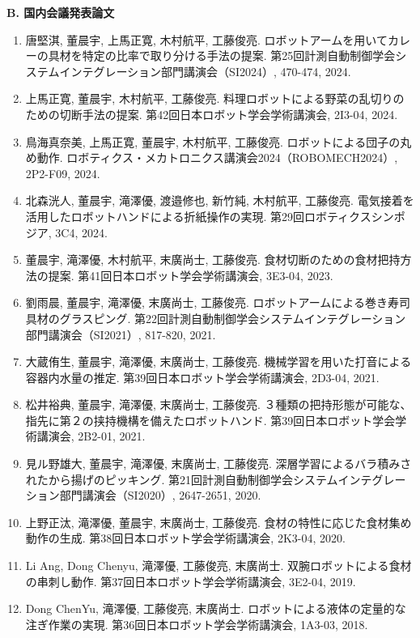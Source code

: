 \vspace{1\baselineskip}
\noindent\textbf{B. 国内会議発表論文}

\begin{enumerate}[
  label=\arabic*).,
  leftmargin=3em,
  itemsep=0.8\baselineskip
]
  \item 唐堅淇, 董晨宇, 上馬正寛, 木村航平, 工藤俊亮. ロボットアームを用いてカレーの具材を特定の比率で取り分ける手法の提案. 第25回計測自動制御学会システムインテグレーション部門講演会（SI2024）, 470-474, 2024.
  \item 上馬正寛, 董晨宇, 木村航平, 工藤俊亮. 料理ロボットによる野菜の乱切りのための切断手法の提案. 第42回日本ロボット学会学術講演会, 2I3-04, 2024.
  \item 鳥海真奈美, 上馬正寛, 董晨宇, 木村航平, 工藤俊亮. ロボットによる団子の丸め動作. ロボティクス・メカトロニクス講演会2024（ROBOMECH2024）, 2P2-F09, 2024.
  \item 北森洸人, 董晨宇, 滝澤優, 渡邉修也, 新竹純, 木村航平, 工藤俊亮. 電気接着を活用したロボットハンドによる折紙操作の実現. 第29回ロボティクスシンポジア, 3C4, 2024.
  \item 董晨宇, 滝澤優, 木村航平, 末廣尚士, 工藤俊亮. 食材切断のための食材把持方法の提案. 第41回日本ロボット学会学術講演会, 3E3-04, 2023.
  \item 劉雨晨, 董晨宇, 滝澤優, 末廣尚士, 工藤俊亮. ロボットアームによる巻き寿司具材のグラスピング. 第22回計測自動制御学会システムインテグレーション部門講演会（SI2021）, 817-820, 2021.
  \item 大蔵侑生, 董晨宇, 滝澤優, 末廣尚士, 工藤俊亮. 機械学習を用いた打音による容器内水量の推定. 第39回日本ロボット学会学術講演会, 2D3-04, 2021.
  \item 松井裕典, 董晨宇, 滝澤優, 末廣尚士, 工藤俊亮. ３種類の把持形態が可能な、指先に第２の挟持機構を備えたロボットハンド. 第39回日本ロボット学会学術講演会, 2B2-01, 2021.
  \item 見ル野雄大, 董晨宇, 滝澤優, 末廣尚士, 工藤俊亮. 深層学習によるバラ積みされたから揚げのピッキング. 第21回計測自動制御学会システムインテグレーション部門講演会（SI2020）, 2647-2651, 2020.
  \item 上野正汰, 滝澤優, 董晨宇, 末廣尚士, 工藤俊亮. 食材の特性に応じた食材集め動作の生成. 第38回日本ロボット学会学術講演会, 2K3-04, 2020.
  \item Li Ang, Dong Chenyu, 滝澤優, 工藤俊亮, 末廣尚士. 双腕ロボットによる食材の串刺し動作. 第37回日本ロボット学会学術講演会, 3E2-04, 2019.
  \item Dong ChenYu, 滝澤優, 工藤俊亮, 末廣尚士. ロボットによる液体の定量的な注ぎ作業の実現. 第36回日本ロボット学会学術講演会, 1A3-03, 2018.
\end{enumerate}